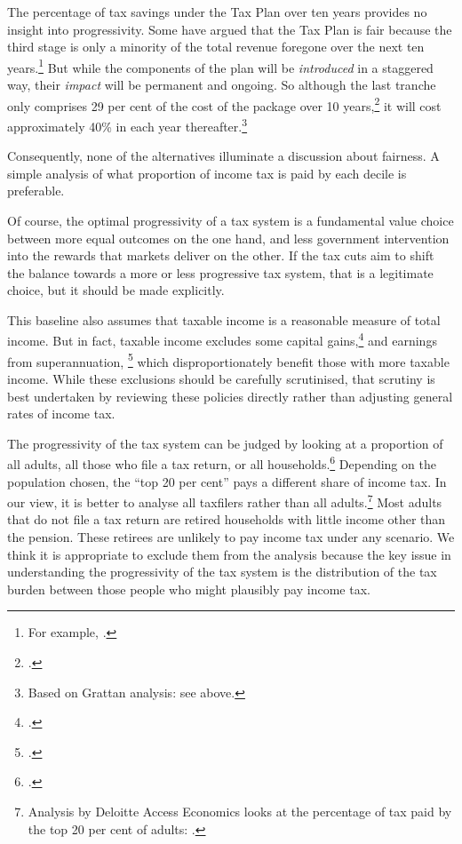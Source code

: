 \documentclass[submission]{grattan}\usepackage[]{graphicx}\usepackage[]{color}
\begin{document}
The percentage of tax savings under the Tax Plan over ten years provides no insight into progressivity. Some have argued that the Tax Plan is fair because the third stage is only a minority of the total revenue foregone over the next ten years.\footnote{For example, \textcite{Kelly2018}.}
But while the components of the plan will be \emph{introduced} in a staggered way, their \emph{impact} will be permanent and ongoing. So although the last tranche only comprises 29 per cent of the cost of the package over 10 years,\footcite[][2]{Treasury2018c}
it will cost approximately 40\% in each year thereafter.\footnote{Based on Grattan analysis: see  above.}

Consequently, none of the alternatives illuminate a discussion about fairness. A simple analysis of what proportion of income tax is paid by each decile is preferable.

Of course, the optimal progressivity of a tax system is a fundamental value choice between more equal outcomes on the one hand, and less government intervention into the rewards that markets deliver on the other. If the tax cuts aim to shift the balance towards a more or less progressive tax system, that is a legitimate choice, but it should be made explicitly.

This baseline also assumes that taxable income is a reasonable measure of total income. But in fact, taxable income excludes some capital gains,\footcite{DaleyWood2016-Negative-Gearing-CGT} and earnings from superannuation,%
  \footcites{DaleyCoatesWood-2015-Super-tax-targeting}{Daley-etal-2016-Assessing-2016-super-tax-reforms} which disproportionately benefit those with more taxable income. While these exclusions should be carefully scrutinised, that scrutiny is best undertaken by reviewing these policies directly rather than adjusting general rates of income tax.

The progressivity of the tax system can be judged by looking at a proportion of all adults, all those who file a tax return, or all households.\footcite{Gothe}
Depending on the population chosen, the ``top 20 per cent'' pays a different share of income tax. In our view, it is better to analyse all taxfilers rather than all adults.\footnote{Analysis by Deloitte Access Economics looks at the percentage of tax paid by the top 20 per cent of adults: \textcite{Greber}.}
Most adults that do not file a tax return are retired households with little income other than the pension. These retirees are unlikely to pay income tax under any scenario. We think it is appropriate to exclude them from the analysis because the key issue in understanding the progressivity of the tax system is the distribution of the tax burden between those people who might plausibly pay income tax.
\end{document}
